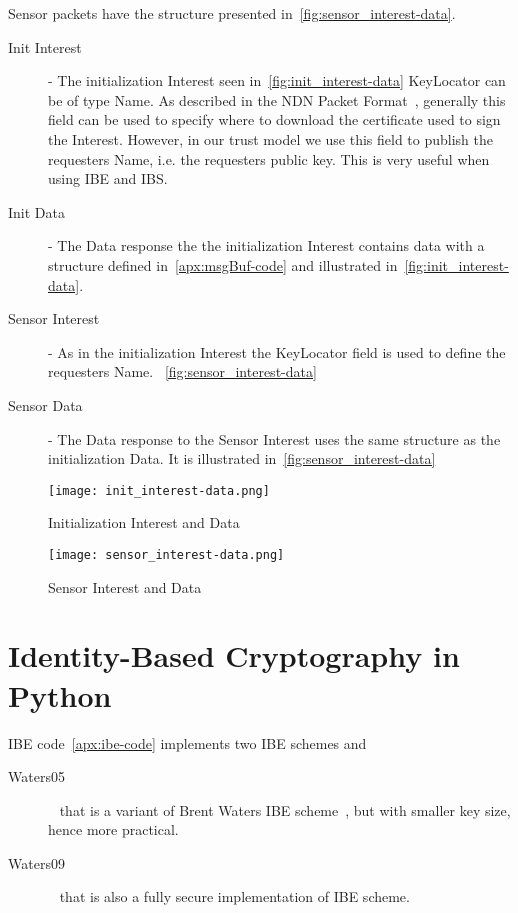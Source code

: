 Sensor packets have the structure presented in~\autoref{fig:sensor_interest-data}.
\begin{description}
	\item[Init Interest] - 
  The initialization Interest seen in~\autoref{fig:init_interest-data}
  KeyLocator can be of type Name. 
  As described in the \gls{NDN} Packet Format~\cite{ndnpacketformat}, generally this field can be used to specify where to download the certificate used to sign the Interest.
  However, in our trust model we use this field to publish the requesters Name, i.e. the requesters public key. 
  This is very useful when using \gls{IBE} and \gls{IBS}.
	\item[Init Data] - 
  The Data response the the initialization Interest contains data with a structure defined in~\autoref{apx:msgBuf-code} and illustrated in~\autoref{fig:init_interest-data}.
	\item[Sensor Interest] -
	As in the initialization Interest the KeyLocator field is used to define the requesters Name. ~\autoref{fig:sensor_interest-data}
	\item[Sensor Data] - 
  The Data response to the Sensor Interest uses the same structure as the initialization Data. It is illustrated in~\autoref{fig:sensor_interest-data}
\end{description}

\begin{figure}[ht]
  \centering
  \texttt{[image: init\_interest-data.png]}
  \caption{Initialization Interest and Data}
  \label{fig:init_interest-data}
\end{figure}

\begin{figure}[ht]
  \centering
  \texttt{[image: sensor\_interest-data.png]}
  \caption{Sensor Interest and Data}
  \label{fig:sensor_interest-data}
\end{figure}

\section{Identity-Based Cryptography in Python}
\gls{IBE} code~\autoref{apx:ibe-code} implements two \gls{IBE} schemes and 

\begin{description}
  \item[Waters05]~\cite{DBLP:journals/iacr/Naccache05} that is a variant of Brent Waters \gls{IBE} scheme~\cite{DBLP:journals/iacr/Waters04}, but with smaller key size, hence more practical.
  \item[Waters09]~\cite{DBLP:conf/crypto/Waters09} that is also a fully secure implementation of \gls{IBE} scheme.
\end{description}

